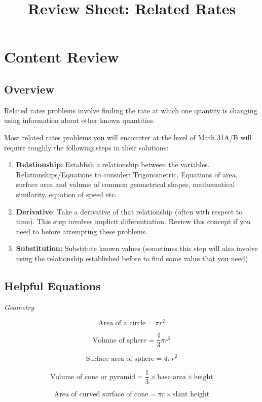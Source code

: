 \documentclass{article}
\title{Review Sheet: Related Rates}
\date{}
\author{}
\begin{document}
\maketitle
\vspace{-0.75in}
\section*{Content Review}
\subsection*{Overview}
Related rates problems involve finding the rate at which one quantity is changing using information about other known quantities. 

Most related rates problems you will encounter at the level of Math 31A/B will require roughly the following steps in their solutions:
\begin{enumerate}
    \item \textbf{Relationship:} Establish a relationship between the variables. \\Relationships/Equations to consider: Trigonometric, Equations of area, surface area and volume of common geometrical shapes, mathematical similarity, equation of speed etc.
    \item \textbf{Derivative}: Take a derivative of that relationship (often with respect to time). This step involves implicit differentiation. Review this concept if you need to before attempting these problems. 
    \item \textbf{Substitution:} Substitute known values (sometimes this step will also involve using the relationship established before to find some value that you need)
\end{enumerate}

\subsection*{Helpful Equations}

\textit{Geometry}

$$\text{Area of a circle} = \pi r^2$$

$$ \text{Volume of sphere} = \frac{4}{3}\pi r^2$$

$$\text{Surface area of sphere} = 4 \pi r^2$$

$$\text{Volume of cone or pyramid} = \frac{1}{3}\times \text{base area} \times \text{height}$$

$$\text{Area of curved surface of cone} = \pi r \times \text{slant height}$$
\end{document}
